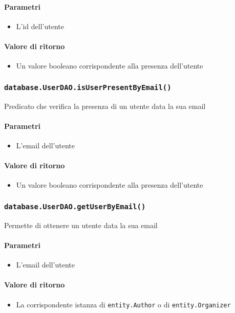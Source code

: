 \paragraph{Parametri}
\begin{itemize}
\item L'id dell'utente
\end{itemize}
\paragraph{Valore di ritorno}
\begin{itemize}
\item Un valore booleano corrispondente alla presenza dell'utente
\end{itemize}

\subsubsection{\texttt{database.UserDAO.isUserPresentByEmail()}}
Predicato che verifica la presenza di un utente data la sua email
\paragraph{Parametri}
\begin{itemize}
\item L'email dell'utente
\end{itemize}
\paragraph{Valore di ritorno}
\begin{itemize}
\item Un valore booleano corrispondente alla presenza dell'utente
\end{itemize}

\subsubsection{\texttt{database.UserDAO.getUserByEmail()}}
Permette di ottenere un utente data la sua email
\paragraph{Parametri}
\begin{itemize}
\item L'email dell'utente
\end{itemize}
\paragraph{Valore di ritorno}
\begin{itemize}
\item La corrispondente istanza di \texttt{entity.Author} o di
  \texttt{entity.Organizer}
\end{itemize}

